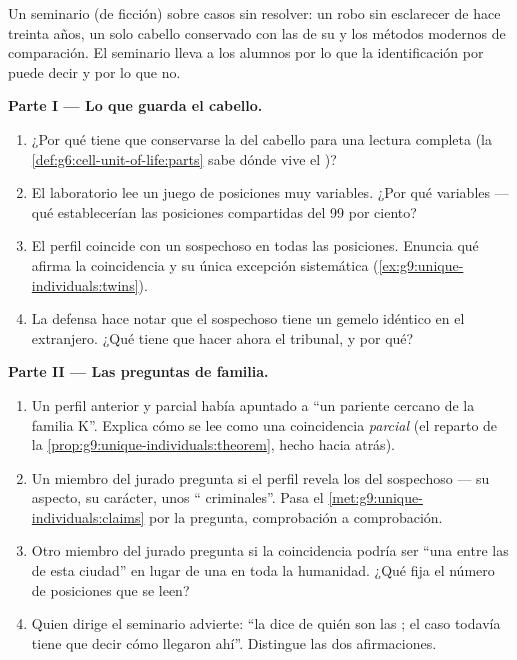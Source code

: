 \begin{problem}\label{pb:g9:unique-individuals:1}
Un seminario (de ficción) sobre casos sin resolver: un robo sin
esclarecer de hace treinta años, un solo cabello conservado con las
 de su  y los métodos modernos de comparación. El seminario
lleva a los alumnos por lo que la identificación por  puede decir y
por lo que no.

\medskip\noindent\textbf{Parte I --- Lo que guarda el
cabello.}
\begin{enumerate}
  \item ¿Por qué tiene que conservarse la \emph{} del cabello para una
        lectura completa (la \cref{def:g6:cell-unit-of-life:parts} sabe
        dónde vive el )?
  \item El laboratorio lee un juego de posiciones muy variables. ¿Por
        qué variables --- qué establecerían las posiciones compartidas
        del 99 por ciento?
  \item El perfil coincide con un sospechoso en todas las posiciones.
        Enuncia qué afirma la coincidencia y su única excepción
        sistemática (\cref{ex:g9:unique-individuals:twins}).
  \item La defensa hace notar que el sospechoso tiene un gemelo
        idéntico en el extranjero. ¿Qué tiene que hacer ahora el
        tribunal, y por qué?
\end{enumerate}

\medskip\noindent\textbf{Parte II --- Las preguntas de
familia.}
\begin{enumerate}[resume]
  \item Un perfil anterior y parcial había apuntado a ``un pariente
        cercano de la familia K''. Explica cómo se lee como 
        una coincidencia \emph{parcial} (el reparto de la
        \cref{prop:g9:unique-individuals:theorem}, hecho hacia atrás).
  \item Un miembro del jurado pregunta si el perfil revela los 
        del sospechoso --- su aspecto, su carácter, unos ``
        criminales''. Pasa el
        \cref{met:g9:unique-individuals:claims} por la pregunta,
        comprobación a comprobación.
  \item Otro miembro del jurado pregunta si la coincidencia podría ser
        ``una entre las de esta ciudad'' en lugar de una en toda la
        humanidad. ¿Qué fija el número de posiciones que se leen?
  \item Quien dirige el seminario advierte: ``la  dice de quién
        son las ; el caso todavía tiene que decir cómo llegaron
        ahí''. Distingue las dos afirmaciones.
\end{enumerate}


\end{problem}

